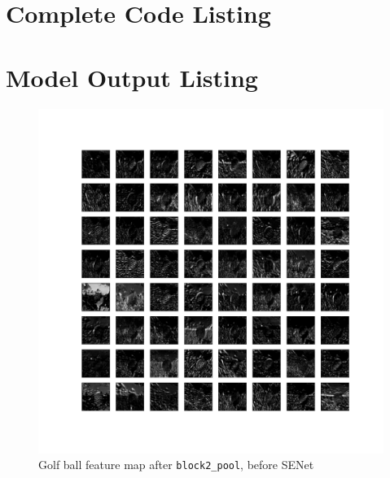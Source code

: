 \documentclass{article}
\begin{document}
\begin{appendices}
\newpage
\section{Complete Code Listing} \label{codelist}



\newpage
\section{Model Output Listing} \label{modelouts}
\begin{figure}[H]
    \centering
    \includegraphics[width=6in]{csci-8110/hw-3/images/golf-pre-SENet-block2_pool-2020-11-05 18_25_06.663590_output.png}
    \caption{Golf ball feature map after \lstinline{block2_pool}, before SENet}
    \label{fig:golf_2_pre}
\end{figure}


\end{appendices}
\end{document}
